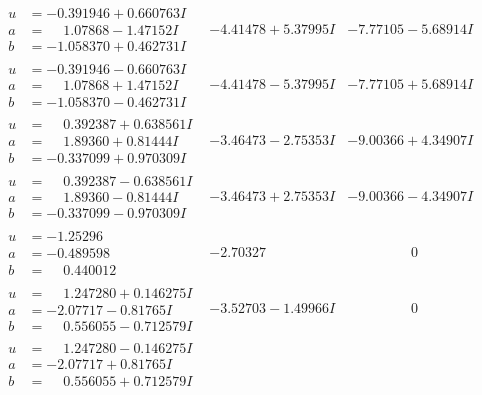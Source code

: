 \documentclass[1p]{elsarticle_modified}
\theoremstyle{definition}
\begin{document}
$$\begin{array}{c|c|c}
\begin{aligned}
u &= -0.391946 + 0.660763 I \\
a &= \phantom{-}1.07868 - 1.47152 I \\
b &= -1.058370 + 0.462731 I\end{aligned}
 & -4.41478 + 5.37995 I & -7.77105 - 5.68914 I \\ \hline\begin{aligned}
u &= -0.391946 - 0.660763 I \\
a &= \phantom{-}1.07868 + 1.47152 I \\
b &= -1.058370 - 0.462731 I\end{aligned}
 & -4.41478 - 5.37995 I & -7.77105 + 5.68914 I \\ \hline\begin{aligned}
u &= \phantom{-}0.392387 + 0.638561 I \\
a &= \phantom{-}1.89360 + 0.81444 I \\
b &= -0.337099 + 0.970309 I\end{aligned}
 & -3.46473 - 2.75353 I & -9.00366 + 4.34907 I \\ \hline\begin{aligned}
u &= \phantom{-}0.392387 - 0.638561 I \\
a &= \phantom{-}1.89360 - 0.81444 I \\
b &= -0.337099 - 0.970309 I\end{aligned}
 & -3.46473 + 2.75353 I & -9.00366 - 4.34907 I \\ \hline\begin{aligned}
u &= -1.25296\phantom{ +0.000000I} \\
a &= -0.489598\phantom{ +0.000000I} \\
b &= \phantom{-}0.440012\phantom{ +0.000000I}\end{aligned}
 & -2.70327\phantom{ +0.000000I} & \phantom{-0.000000 } 0 \\ \hline\begin{aligned}
u &= \phantom{-}1.247280 + 0.146275 I \\
a &= -2.07717 - 0.81765 I \\
b &= \phantom{-}0.556055 - 0.712579 I\end{aligned}
 & -3.52703 - 1.49966 I & \phantom{-0.000000 } 0 \\ \hline\begin{aligned}
u &= \phantom{-}1.247280 - 0.146275 I \\
a &= -2.07717 + 0.81765 I \\
b &= \phantom{-}0.556055 + 0.712579 I\end{aligned}

\end{array}$$
\end{document}
